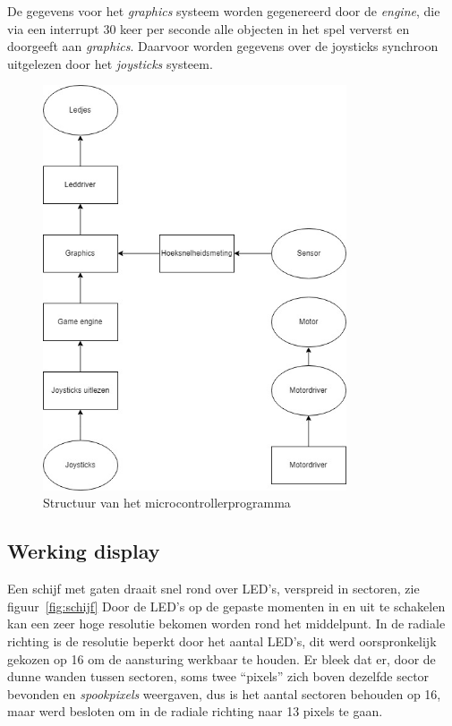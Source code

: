 \documentclass[12pt]{ugentreport}
\begin{document}
De gegevens voor het \emph{graphics} systeem worden gegenereerd door de
\emph{engine}, die via een interrupt 30 keer per seconde alle objecten in het
spel ververst en doorgeeft aan \emph{graphics}. Daarvoor worden gegevens over de
joysticks synchroon uitgelezen door het \emph{joysticks} systeem.

\begin{figure}
  \centering
  \includegraphics[width=0.8\textwidth]{img/structuur.jpg}
  \caption{Structuur van het microcontrollerprogramma}
  \label{fig:structuur}
\end{figure}


\subsection{Werking display}
Een schijf met gaten draait snel rond over LED's, verspreid in sectoren, zie figuur~\ref{fig:schijf}
Door de LED's op de gepaste momenten in en uit te schakelen
kan een zeer hoge resolutie bekomen worden rond het middelpunt.
In de radiale richting is de resolutie beperkt door het aantal LED's,
dit werd oorspronkelijk gekozen op 16 om de aansturing werkbaar te houden.
Er bleek dat er, door de dunne wanden tussen sectoren, soms twee ``pixels''
zich boven dezelfde sector bevonden en \emph{spookpixels} weergaven,
dus is het aantal sectoren behouden op 16,
maar werd besloten om in de radiale richting naar 13 pixels te gaan.
\end{document}
